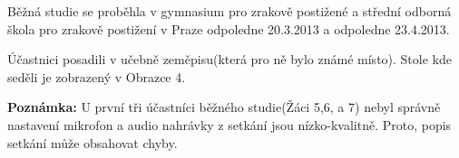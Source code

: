Běžná studie se proběhla v gymnasium pro zrakově postižené a střední odborná škola pro zrakově postižení v Praze odpoledne 20.3.2013 a odpoledne 23.4.2013.

Účastnici posadili v učebně zeměpisu(která pro ně bylo známé místo).  Stole kde seděli je zobrazený v Obrazce 4.

{\bf Poznámka:}  U první tři účastníci běžného studie(Žáci 5,6, a 7) nebyl správně nastavení mikrofon a audio nahrávky z setkání jsou nízko-kvalitně.  Proto, popis setkání může obsahovat chyby.






